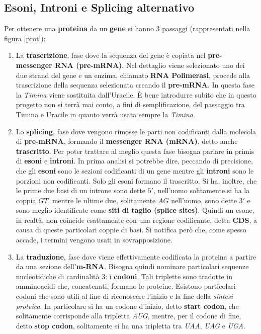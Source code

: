 \documentclass[a4paper,12pt, oneside]{book}
\begin{document}
\subsection{Esoni, Introni e Splicing alternativo}
Per ottenere una \textbf{proteina} da un \textbf{gene} si hanno 3 passaggi
(rappresentati nella figura \ref{prot}):
\begin{enumerate}
  \item La \textbf{trascrizione}, fase dove la sequenza del gene è copiata
  nel \textbf{pre-messenger RNA (pre-mRNA)}. Nel dettaglio viene selezionato uno
  dei due strand del gene e un enzima, chiamato \textbf{RNA Polimerasi}, procede
  alla trascrizione della sequenza selezionata creando il \textbf{pre-mRNA}. In
  questa fase la \textit{Timina} viene sostituita dall'Uracile. È bene
  introdurre subito che in questo progetto non si terrà mai conto, a fini di
  semplificazione, del passaggio tra Timina e Uracile in quanto verrà usata
  sempre la \textit{Timina}.
  \item Lo \textbf{splicing}, fase dove vengono rimosse le parti non codificanti
  dalla molecola di \textbf{pre-mRNA}, formando il \textbf{messenger RNA
    (mRNA)},
  detto anche \textbf{trascritto}. Per poter trattare al meglio questa fase
  bisogna parlare in primis di \textbf{esoni} e \textbf{introni}. In prima
  analisi si potrebbe dire, peccando di precisione, che gli
  \textbf{esoni} sono le sezioni codificanti di un gene mentre gli
  \textbf{introni} sono le porzioni non codificanti. Solo gli esoni formano il
  trascritto. Si ha, inoltre, che le prime due basi di un introne sono dette
  $5'$, nell'uomo solitamente si ha la coppia $GT$, mentre le ultime due,
  solitamente $AG$ nell'uomo, sono
  dette $3'$ e sono meglio identificate come \textbf{siti di taglio (splice
    sites)}. 
  Quindi un esone, in realtà, non coincide esattamente con una regione
  codificante, detta \textbf{CDS}, a causa di queste particolari coppie di
  basi. Si notifica però che, come spesso accade, i termini vengono usati in
  sovrapposizione. 
  \newpage
  \item La \textbf{traduzione}, fase dove viene effettivamente codificata la
  proteina a partire da una sezione dell'\textbf{m-RNA}. 
  Bisogna quindi nominare particolari sequenze nucleotidiche di cardinalità 3: i
  \textbf{codoni}. Tali triplette sono tradotte in amminoacidi che, concatenati,
  formano le proteine. Esistono particolari codoni che sono utili al fine
  di riconoscere l'inizio e la fine della \textit{sintesi proteica}. In
  particolare si ha un codone d'inizio, detto \textbf{start codon}, che
  solitamente corrisponde alla tripletta \textit{AUG}, mentre, per il codone di
  fine, detto \textbf{stop codon}, solitamente si ha una tripletta tra
  \textit{UAA}, \textit{UAG} e  \textit{UGA}.
\end{enumerate}
\end{document}
